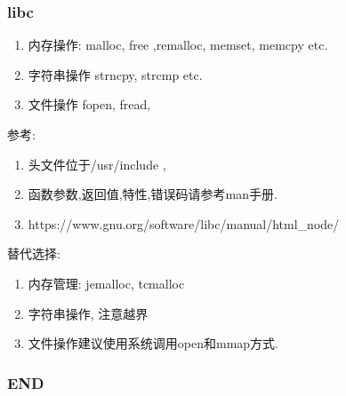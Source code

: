 \begin{frame}
\frametitle{libc}

\begin{enumerate}
\item 内存操作: malloc, free ,remalloc, memset, memcpy etc.
\item 字符串操作 strncpy, strcmp etc.
\item 文件操作 fopen, fread,
\end{enumerate}

参考:
\begin{enumerate}
\item 头文件位于/usr/include ,
\item 函数参数,返回值,特性,错误码请参考man手册.
\item https://www.gnu.org/software/libc/manual/html_node/
\end{enumerate}

替代选择:
\begin{enumerate}
\item 内存管理: jemalloc, tcmalloc
\item 字符串操作, 注意越界
\item 文件操作建议使用系统调用open和mmap方式.
\end{enumerate}

\end{frame}



\begin{frame}
\frametitle{END}
\end{frame}


